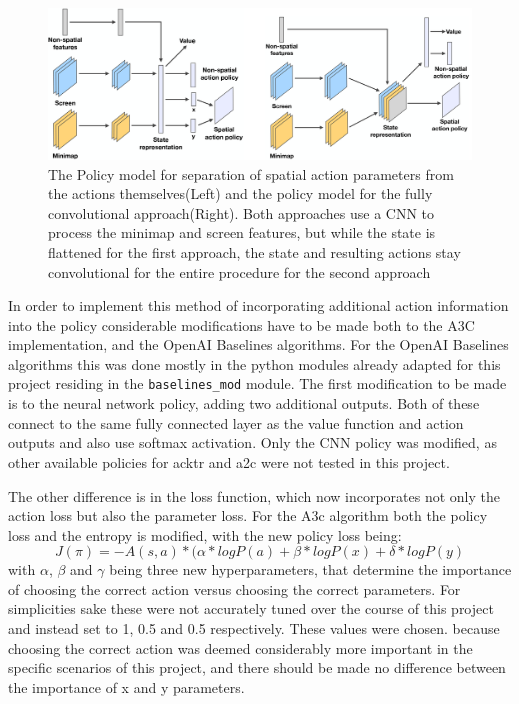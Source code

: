 \begin{figure}[htb]
  \centering
      \includegraphics[width=1\textwidth]{Figures/sc2le/sc2le_state.png}
  \caption{The Policy model for separation of spatial action parameters from the actions themselves(Left) and the policy model for the fully convolutional approach(Right). Both approaches use a CNN to process the minimap and screen features, but while the state is flattened for the first approach, the state and resulting actions stay convolutional for the entire procedure for the second approach \citep{DBLP:journals/corr/dmsc2} }
  \label{fig:pysc2_state}
\end{figure}


In order to implement this method of incorporating additional action information into the policy considerable modifications have to be made both to the A3C implementation, and the OpenAI Baselines algorithms. For the OpenAI Baselines algorithms this was done mostly in the python modules already adapted for this project residing in the \lstinline{baselines_mod} module. The first modification to be made is to the neural network policy, adding two additional outputs. Both of these connect to the same fully connected layer as the value function and action outputs and also use softmax activation. Only the CNN policy was modified, as other available policies for acktr and a2c were not tested in this project.

The other difference is in the loss function, which now incorporates not only the action loss but also the parameter loss. For the A3c algorithm both the policy loss and the entropy is modified, with the new policy loss being:
$$J(\pi) = -A(s, a) * (\alpha * log P(a) + \beta * log P(x) + \delta * log P(y)$$
with $\alpha$, $\beta$ and $\gamma$ being three new hyperparameters, that determine the importance of choosing the correct action versus choosing the correct parameters. For simplicities sake these were not accurately tuned over the course of this project and instead set to 1, 0.5 and 0.5 respectively. These values were chosen. because choosing the correct action was deemed considerably more important in the specific scenarios of this project, and there should be made no difference between the importance of x and y parameters.

